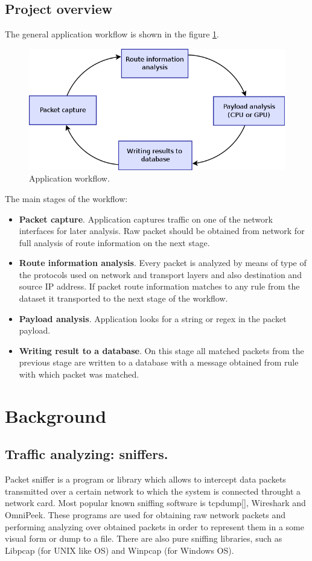 \documentclass[thesis=M,english]{FITthesis}[2011/07/15]
\begin{document}
\section{Project overview}

The general application workflow is shown in the figure \ref{fig:app_workflow}.
\begin{figure}[h]
\centering
\includegraphics[scale=0.4]{images/workflow.png}
\caption{Application workflow.}
\label{fig:app_workflow}
\end{figure}

The main stages of the workflow:
\begin{itemize}
\item \textbf{Packet capture}. Application captures traffic on one of the network interfaces for later analysis. Raw packet should be obtained from network for full analysis of route information on the next stage.
\item \textbf{Route information analysis}. Every packet is analyzed by means of type of the protocols used on network and transport layers and also destination and source IP address. If packet route information matches to any rule from the dataset it transported to the next stage of the workflow.
\item \textbf{Payload analysis}. Application looks for a string or regex in the packet payload.
\item \textbf{Writing result to a database}. On this stage all matched packets from the previous stage are written to a database with a message obtained from rule with which packet was matched.
\end{itemize}

\chapter{Background}
\section{Traffic analyzing: sniffers.}
Packet sniffer is a program or library which allows to intercept data packets transmitted over a certain network to which the system is connected throught a network card. Most popular known sniffing software is tcpdump[], Wireshark and OmniPeek. These programs are used for obtaining raw network packets and performing analyzing over obtained packets in order to represent them in a some visual form or dump to a file. There are also pure sniffing libraries, such as Libpcap (for UNIX like OS) and Winpcap (for Windows OS).
\end{document}
